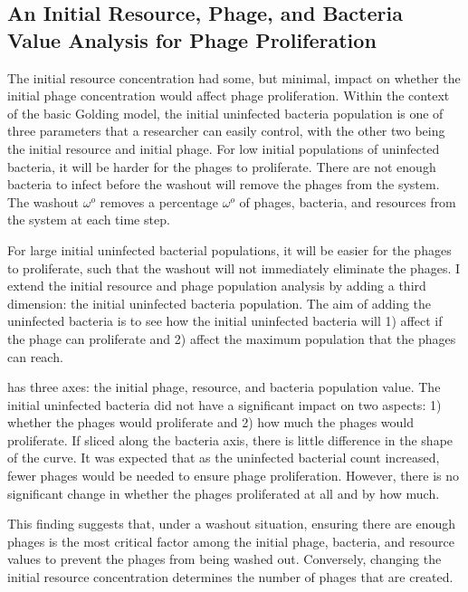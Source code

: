 \subsection{An Initial Resource, Phage, and Bacteria Value Analysis for Phage Proliferation}
The initial resource concentration had some, but minimal, impact on whether the initial phage concentration would affect phage proliferation. 
Within the context of the basic Golding model, the initial uninfected bacteria population is one of three parameters that a researcher can easily control, with the other two being the initial resource and initial phage. 
For low initial populations of uninfected bacteria, it will be harder for the phages to proliferate. 
There are not enough bacteria to infect before the washout will remove the phages from the system. 
The washout $\omega^o$ removes a percentage $\omega^o$ of phages, bacteria, and resources from the system at each time step. 

For large initial uninfected bacterial populations, it will be easier for the phages to proliferate, such that the washout will not immediately eliminate the phages. 
I extend the initial resource and phage population analysis by adding a third dimension: the initial uninfected bacteria population. 
The aim of adding the uninfected bacteria is to see how the initial uninfected bacteria will 1) affect if the phage can proliferate and 2) affect the maximum population that the phages can reach. 

 has three axes: the initial phage, resource, and bacteria population value. 
The initial uninfected bacteria did not have a significant impact on two aspects: 1) whether the phages would proliferate and 2) how much the phages would proliferate. 
If sliced along the bacteria axis, there is little difference in the shape of the curve. 
It was expected that as the uninfected bacterial count increased, fewer phages would be needed to ensure phage proliferation. 
However, there is no significant change in whether the phages proliferated at all and by how much. 

This finding suggests that, under a washout situation, ensuring there are enough phages is the most critical factor among the initial phage, bacteria, and resource values to prevent the phages from being washed out. Conversely, changing the initial resource concentration determines the number of phages that are created. 

